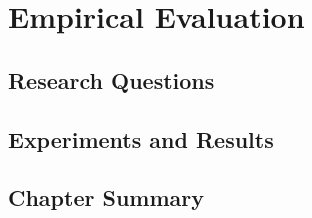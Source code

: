 \chapter{Empirical Evaluation}\label{experiments}
\section{Research Questions}
\section{Experiments and Results}
\section{Chapter Summary}

